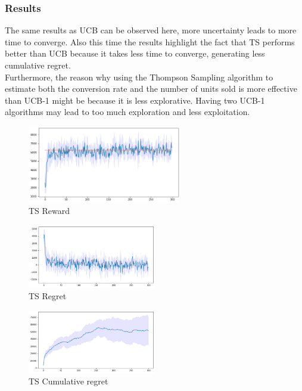 \subsubsection{Results}
The same results as UCB can be observed here, more uncertainty leads to more time to converge. Also this time the results highlight the fact that TS performs better than UCB because it takes less time to converge, generating less cumulative regret.\\ Furthermore, the reason why using the Thompson Sampling algorithm to estimate both the conversion rate and the number of units sold is more effective than UCB-1 might be because it is less explorative. Having two UCB-1 algorithms may lead to too much exploration and less exploitation.
\begin{figure}[ht]
    \begin{center}
    \includegraphics[width=0.6\textwidth]{img/TS4.png}
    \caption{TS Reward}
    \label{fig:reward42}
    \end{center}
\end{figure}
\begin{multicols}{2}
    \begin{figure}[H]
        \begin{center}
        \includegraphics[width=0.5\textwidth]{img/TS4_regret.png}
        \caption{TS Regret}
        \label{fig:regret42}
        \end{center}
    \end{figure}
    \columnbreak
    \begin{figure}[H]
        \begin{center}
        \includegraphics[width=0.5\textwidth]{img/TS4_cum_reg.png}
        \caption{TS Cumulative regret}
        \label{fig:cum_reg42}
        \end{center}
    \end{figure}
\end{multicols}
